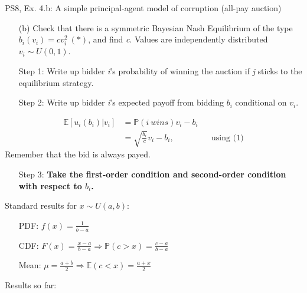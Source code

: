 \begin{frame}{PS8, Ex. 4.b: A simple principal-agent model of corruption (all-pay auction)}
    \begin{itemize}
      \item[(b)] Check that there is a symmetric Bayesian Nash Equilibrium of the type $b_i(v_i) = cv_i^2\ (*)$, and find \textit{c}. Values are independently distributed $v_i\sim U(0, 1)$.
    \end{itemize} \vspace{-8pt}
    \begin{multicols}{2}
      \begin{itemize}
        \item[Step 1:] Write up bidder \textit{i}'s probability of winning the auction if \textit{j} sticks to the equilibrium strategy.
        \item[Step 2:] Write up bidder \textit{i}'s expected payoff from bidding $b_i$ conditional on $v_i$.
      \end{itemize} \vspace{-8pt}
      \begin{align*}
        \mathbb{E}[u_i(b_i)|v_i]&=\mathbb{P}(i\ wins)v_i-b_i\\
                           &=\sqrt{\frac{b_i}{c}}v_i-b_i,&&\text{using (1)}
      \end{align*} \vspace{-8pt}
      Remember that the bid is always payed. \vspace{4pt}
      \begin{itemize}
        \item[Step 3:] \textbf{Take the first-order condition and second-order condition with respect to $b_i$.}
      \end{itemize}
      \vfill\null\columnbreak
      Standard results for $x\sim U(a, b):$ \vspace{-6pt}
      \begin{itemize}
        \item[PDF:] $f(x)=\frac{1}{b-a}$
        \item[CDF:] $F(x)=\frac{x-a}{b-a}\Rightarrow\mathbb{P}(c>x)=\frac{c-a}{b-a}$
        \item[Mean:] $\mu=\frac{a+b}{2}\Rightarrow\mathbb{E}(c<x)=\frac{a+x}{2}$
      \end{itemize}
      \vspace{-6pt}
      Results so far: \vspace{-6pt}
      \begin{align*}

\end{align*}
\end{multicols}
\end{frame}
